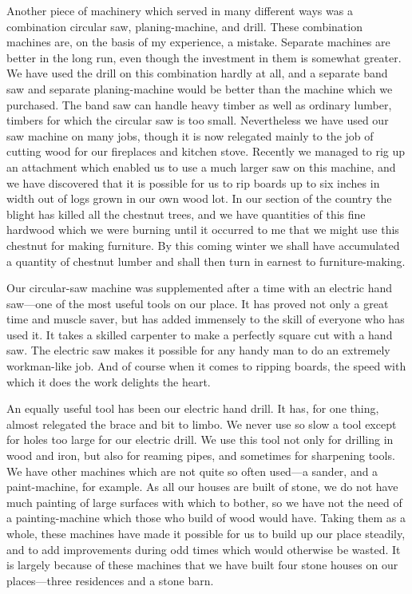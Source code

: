 \documentclass{book}
\begin{document}
Another piece of machinery which served in many different ways was a combination circular saw, planing-machine, and drill. These combination machines are, on the basis of my experience, a mistake. Separate machines are better in the long run, even though the investment in them is somewhat greater. We have used the drill on this combination hardly at all, and a separate band saw and separate planing-machine would be better than the machine which we purchased. The band saw can handle heavy timber as well as ordinary lumber, timbers for which the circular saw is too small. Nevertheless we have used our saw machine on many jobs, though it is now relegated mainly to the job of cutting wood for our fireplaces and kitchen stove. Recently we managed to rig up an attachment which enabled us to use a much larger saw on this machine, and we have discovered that it is possible for us to rip boards up to six inches in width out of logs grown in our own wood lot. In our section of the country the blight has killed all the chestnut trees, and we have quantities of this fine hardwood which we were burning until it occurred to me that we might use this chestnut for making furniture. By this coming winter we shall have accumulated a quantity of chestnut lumber and shall then turn in earnest to furniture-making.

Our circular-saw machine was supplemented after a time with an electric hand saw—one of the most useful tools on our place. It has proved not only a great time and muscle saver, but has added immensely to the skill of everyone who has used it. It takes a skilled carpenter to make a perfectly square cut with a hand saw. The electric saw makes it possible for any handy man to do an extremely workman-like job. And of course when it comes to ripping boards, the speed with which it does the work delights the heart.

An equally useful tool has been our electric hand drill. It has, for one thing, almost relegated the brace and bit to limbo. We never use so slow a tool except for holes too large for our electric drill. We use this tool not only for drilling in wood and iron, but also for reaming pipes, and sometimes for sharpening tools. We have other machines which are not quite so often used—a sander, and a paint-machine, for example. As all our houses are built of stone, we do not have much painting of large surfaces with which to bother, so we have not the need of a painting-machine which those who build of wood would have. Taking them as a whole, these machines have made it possible for us to build up our place steadily, and to add improvements during odd times which would otherwise be wasted. It is largely because of these machines that we have built four stone houses on our places—three residences and a stone barn.
\end{document}
